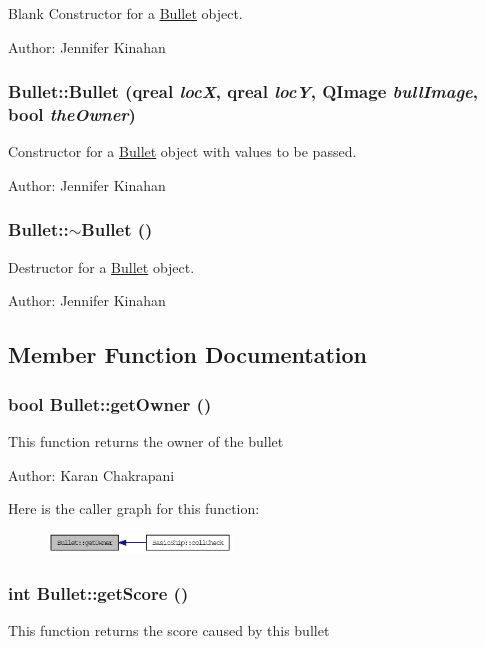 Blank Constructor for a \hyperlink{class_bullet}{Bullet} object.

Author: Jennifer Kinahan \hypertarget{class_bullet_ae5ffe28b85e0c71327b1d400f3b065a3}{
\subsubsection[{Bullet}]{\setlength{\rightskip}{0pt plus 5cm}Bullet::Bullet (qreal {\em locX}, \/  qreal {\em locY}, \/  QImage {\em bullImage}, \/  bool {\em theOwner})}}
\label{class_bullet_ae5ffe28b85e0c71327b1d400f3b065a3}
Constructor for a \hyperlink{class_bullet}{Bullet} object with values to be passed.

Author: Jennifer Kinahan \hypertarget{class_bullet_aaeb5cb41d7db89f49007b08b41f1bfcf}{
\subsubsection[{$\sim$Bullet}]{\setlength{\rightskip}{0pt plus 5cm}Bullet::$\sim$Bullet ()}}
\label{class_bullet_aaeb5cb41d7db89f49007b08b41f1bfcf}
Destructor for a \hyperlink{class_bullet}{Bullet} object.

Author: Jennifer Kinahan 

\subsection{Member Function Documentation}
\hypertarget{class_bullet_ab2959056bba728b7f0a84b15aca1bee3}{
\subsubsection[{getOwner}]{\setlength{\rightskip}{0pt plus 5cm}bool Bullet::getOwner ()}}
\label{class_bullet_ab2959056bba728b7f0a84b15aca1bee3}
This function returns the owner of the bullet

Author: Karan Chakrapani 

Here is the caller graph for this function:\nopagebreak
\begin{figure}[H]
\begin{center}
\leavevmode
\includegraphics[width=139pt]{class_bullet_ab2959056bba728b7f0a84b15aca1bee3_icgraph}
\end{center}
\end{figure}
\hypertarget{class_bullet_adf5073e03d5eb9ce5cbf2af3653d02ef}{
\subsubsection[{getScore}]{\setlength{\rightskip}{0pt plus 5cm}int Bullet::getScore ()}}
\label{class_bullet_adf5073e03d5eb9ce5cbf2af3653d02ef}
This function returns the score caused by this bullet

